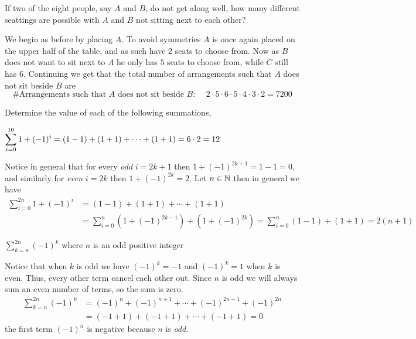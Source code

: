 \documentclass[a4paper, english, 12pt]{article} %
\begin{document}
\begin{subproblem}
  If two of the eight people, say $A$ and $B$, do not get along well, how many
  different seattings are possible with $A$ and $B$ not sitting next to each other?
\end{subproblem}

\begin{answer}
  We begin as before by placing $A$. To avoid symmetries $A$ is once again
  placed on the upper half of the table, and as such have $2$ seats to choose
  from. Now as $B$ does not want to sit next to $A$ he only has $5$ seats to
  choose from, while $C$ still has $6$. Continuing we get that the total number
  of arrangements such that $A$ does not sit beside $B$ are
  \begin{equation*}
    \text{\# Arrangements such that $A$ does not sit beside $B$: } \quad
    2 \cdot 5 \cdot 6 \cdot 5 \cdot 4 \cdot 3 \cdot 2 = 7200
  \end{equation*}
\end{answer}



\begin{problem}[16]
  Determine the value of each of the following summations,
\end{problem}

\begin{subproblem}[3]
  $\displaystyle \sum_{i = 0}^{10} 1 + (-1)^i \ans{= (1 - 1) + (1 + 1) + \cdots
    + (1 +
  1) = 6 \cdot 2 = 12}$
\end{subproblem}

\begin{answer}
  Notice in general that for every \emph{odd} $i = 2k+1$  then $1 + (-1)^{2k+1}
  = 1 - 1 = 0$, and similarly for \emph{even} $i = 2k$ then $1 + (-1)^{2k} = 2$.
  Let $n \in \mathbb{N}$ then in general we have
  \begin{align*}
    \sum_{i = 0}^{2n} 1 + (-1)^i
    & = (1 - 1) + (1 + 1) + \cdots + (1 + 1) \\
    & = \sum_{i = 0}^n (1 + (-1)^{2k-1}) + (1 + (-1)^{2k})
    = \sum_{i = 0}^n (1 - 1) + (1 + 1)
    = 2 (n + 1)
  \end{align*}
\end{answer}

\begin{subproblem}
  $\displaystyle \sum_{k = n}^{2n} (-1)^k$ where $n$ is an odd positive integer
\end{subproblem}

\begin{answer}
  Notice that when $k$ is odd we have $(-1)^k = - 1$ and $(-1)^{k} = 1$ when $k$
  is even. Thus, every other term cancel each other out. Since $n$ is odd we
  will always sum an even number of terms, so the sum is zero.
  \begin{align*}
    \sum_{k=n}^{2n} (-1)^k
    & = (-1)^{n} + (-1)^{n+1} + \cdots + (-1)^{2n-1} + (-1)^{2n} \\
    & = (-1 + 1) + (-1 + 1) + \cdots + (-1 + 1)
      = 0
  \end{align*}
  the first term $(-1)^n$ is negative because $n$ is \emph{odd}.
\end{answer}
\end{document}

